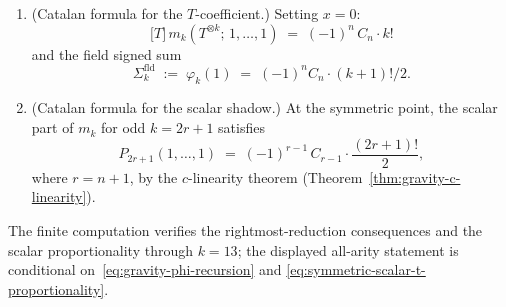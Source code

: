 \begin{theorem}
\begin{enumerate}[label=\textup{(\roman*)}]
 with roots $\{-2, -3, \ldots, -k\}$, and every depth
 $d \in \{0, 1, \ldots, k-1\}$ is populated with nonzero
 coefficient.
\item \textup{(Catalan formula for the $T$-coefficient.)}
 Setting $x = 0$:
 \begin{equation}\label{eq:symmetric-catalan-T}
 \bigl[T\bigr]\,m_k(T^{\otimes k};\,1,\ldots,1)
 \;=\;
 (-1)^n\,C_n\cdot k!
 \end{equation}
 and the field signed sum
 \[
 \Sigma_k^{\mathrm{fld}}
 \;:=\;
 \varphi_k(1)
 \;=\;
 (-1)^n C_n \cdot (k{+}1)!/2 .
 \]
\item \textup{(Catalan formula for the scalar shadow.)}
 At the symmetric point, the scalar part of $m_k$ for odd
 $k = 2r{+}1$ satisfies
 \begin{equation}\label{eq:symmetric-catalan}
 P_{2r+1}(1,\ldots,1)
 \;=\;
 (-1)^{r-1}\, C_{r-1} \cdot \frac{(2r+1)!}{2},
 \end{equation}
 where $r = n{+}1$, by the $c$-linearity theorem
 \textup{(}Theorem~\textup{\ref{thm:gravity-c-linearity})}.
\end{enumerate}
The finite computation verifies the rightmost-reduction consequences and
the scalar proportionality through $k = 13$; the displayed all-arity
statement is conditional on~\eqref{eq:gravity-phi-recursion} and
\eqref{eq:symmetric-scalar-t-proportionality}.
\end{theorem}

